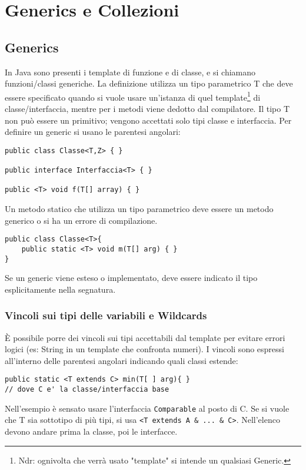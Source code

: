 \chapter{Generics e Collezioni}

\section{Generics}
In Java sono presenti i template di funzione e di classe, e si chiamano funzioni/classi generiche. La definizione utilizza un tipo parametrico T che deve essere specificato quando si vuole usare un'istanza di quel template\footnote{Ndr: ognivolta che verrà usato "template" si intende un qualsiasi Generic.} di classe/interfaccia, mentre per i metodi viene dedotto dal compilatore. Il tipo T non può essere un primitivo; vengono accettati solo tipi classe e interfaccia.
Per definire un generic si usano le parentesi angolari:
\begin{lstlisting}
public class Classe<T,Z> { }

public interface Interfaccia<T> { }

public <T> void f(T[] array) { }
\end{lstlisting}

Un metodo statico che utilizza un tipo parametrico deve essere un metodo generico o si ha un errore di compilazione. 
\begin{lstlisting}
public class Classe<T>{
	public static <T> void m(T[] arg) { }
}
\end{lstlisting}

Se un generic viene esteso o implementato, deve essere indicato il tipo esplicitamente nella segnatura.

\subsection{Vincoli sui tipi delle variabili e Wildcards}
È possibile porre dei vincoli sui tipi accettabili dal template per evitare errori logici (es: String in un template che confronta numeri). I vincoli sono espressi all'interno delle parentesi angolari indicando quali classi estende:

\begin{lstlisting}
public static <T extends C> min(T[ ] arg){ }
// dove C e' la classe/interfaccia base
\end{lstlisting}
Nell'esempio è sensato usare l'interfaccia \texttt{Comparable} al posto di C.
Se si vuole che T sia sottotipo di più tipi, si usa \texttt{<T extends A \& ... \& C>}. Nell'elenco devono andare prima la classe, poi le interfacce.

